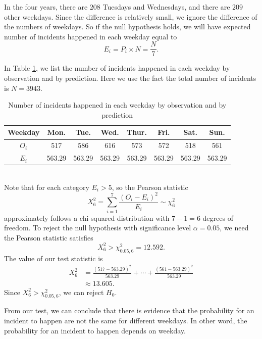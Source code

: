 \documentclass[11pt,a4paper,english]{article}
\begin{document}
In the four years, there are $208$ Tuesdays and Wednesdays, and there are $209$ other weekdays. 
Since the difference is relatively small, we ignore the difference of the numbers of weekdays.
So if the null hypothesis holds, we will have expected number of incidents happened in each weekday equal to
\begin{equation*}
	E_{i} = P_{i} \times N = \frac{N}{7}.
\end{equation*}

In Table \ref{tab:weekdays}, we list the number of incidents happened in each weekday by observation and by prediction. 
Here we use the fact the total number of incidents is $N = 3943$.
\begin{table}[htbp]
	\centering
	\begin{tabular}{c|ccccccc}
		\hline
		Weekday & Mon. & Tue. & Wed. & Thur. & Fri. & Sat. & Sun.\\
		\hline
		$O_{i}$ & 517 & 586 & 616 & 573 & 572 & 518 & 561\\ \hline
		$E_{i}$ & 563.29 & 563.29 & 563.29 & 563.29 & 563.29 & 563.29 & 563.29\\
		\hline
	\end{tabular}
	\caption{Number of incidents happened in each weekday by observation and by prediction}
	\label{tab:weekdays}
\end{table}
\\Note that for each category $E_{i} > 5$, so the Pearson statistic
\begin{equation*}
	X^{2}_{6} = \sum_{i = 1}^{7}\frac{(O_{i} - E_{i})^{2}}{E_{i}}
	\sim \chi^{2}_{6}
\end{equation*}
approximately follows a chi-squared distribution with $7-1 = 6$ degrees of freedom. 
To reject the null hypothesis with significance level $\alpha = 0.05$, we need the Pearson statistic satisfies
\begin{equation*}
	X^{2}_{6} > \chi^{2}_{0.05,6} = 12.592.
\end{equation*}
The value of our test statistic is
\begin{align*}
	X^{2}_{6} &= \frac{(517-563.29)^{2}}{563.29}+\cdots+\frac{(561-563.29)^{2}}{563.29}\\
	&\approx 13.605.
\end{align*}
Since $X^{2}_{6} > \chi^{2}_{0.05,6}$, we can reject $H_{0}$.

From our test, we can conclude that there is evidence that the probability for an incident to happen are not the same for different weekdays. In other word, the probability for an incident to happen depends on weekday.
\end{document}

